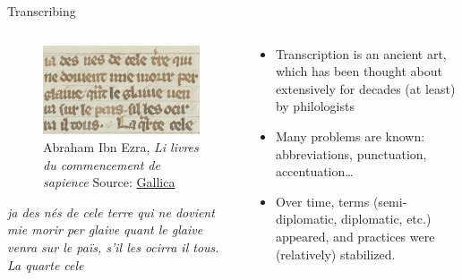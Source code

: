 \documentclass[aspectratio=169]{beamer}
\begin{document}

    \begin{frame}{Transcribing}
        \begin{columns}[t]
            \begin{column}{.52\textwidth}
                    \vspace{-1.5em}
                    \begin{figure}
                        \centering
			            \includegraphics[width=\textwidth,height=0.6\textheight,keepaspectratio]{nlp-for-ch/images/MA_btv1b10465182x_137.jpeg}
                        \caption{\small Abraham Ibn Ezra, \textit{Li livres du commencement de sapience} \tiny{Source: \href{https://gallica.bnf.fr/ark:/12148/btv1b10465182x/f137.item}{Gallica}}}
                        \label{fig:ibnEzra}
                    \end{figure}
                    
                    \vspace{-1em}
                    \textit{ja des nés de cele terre qui ne dovient mie morir per glaive quant le glaive venra sur le païs, s'il les ocirra il tous. La quarte cele}
            \end{column}
            \begin{column}{.48\textwidth}
                \begin{itemize}
                    \item Transcription is an ancient art, which has been thought about extensively for decades (at least) by philologists
                    \item Many problems are known: abbreviations, punctuation, accentuation…
                    \item Over time, terms (semi-diplomatic, diplomatic, etc.) appeared, and practices were (relatively) stabilized.
                \end{itemize}
            \end{column}
        \end{columns}
    \end{frame}
\end{document}
